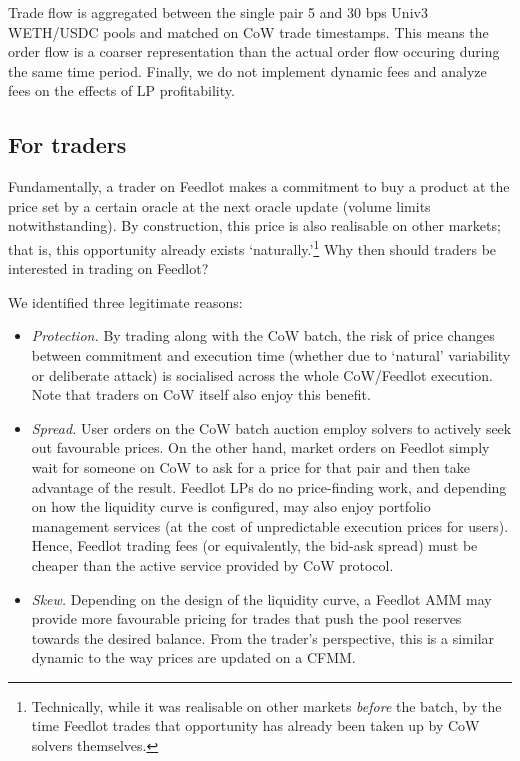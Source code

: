 \documentclass[a4paper,10pt]{article}
\theoremstyle{remark}
\begin{document}
Trade flow is aggregated between the single pair 5 and 30 bps Univ3 WETH/USDC pools and matched on CoW trade timestamps. This means the order flow is a coarser representation than the actual order flow occuring during the same time period. 
%
Finally, we do not implement dynamic fees and analyze fees on the effects of LP profitability. 

\subsection{For traders}

Fundamentally, a trader on Feedlot makes a commitment to buy a product at the price set by a certain oracle at the next oracle update (volume limits notwithstanding).
%
By construction, this price is also realisable on other markets; that is, this opportunity already exists `naturally.'\footnote{Technically, while it was realisable on other markets \emph{before} the batch, by the time Feedlot trades that opportunity has already been taken up by CoW solvers themselves.}
%
Why then should traders be interested in trading on Feedlot?

We identified three legitimate reasons:
\begin{itemize}
  \item 
    \emph{Protection.} By trading along with the CoW batch, the risk of price changes between commitment and execution time (whether due to `natural' variability or deliberate attack) is socialised across the whole CoW/Feedlot execution.
    Note that traders on CoW itself also enjoy this benefit.
    
  \item
    \emph{Spread.} User orders on the CoW batch auction employ solvers to actively seek out favourable prices. On the other hand, market orders on Feedlot simply wait for someone on CoW to ask for a price for that pair and then take advantage of the result.
    Feedlot LPs do no price-finding work, and depending on how the liquidity curve is configured, may also enjoy portfolio management services (at the cost of unpredictable execution prices for users).
    Hence, Feedlot trading fees (or equivalently, the bid-ask spread) must be cheaper than the active service provided by CoW protocol.
    
  \item
    \emph{Skew.} Depending on the design of the liquidity curve, a Feedlot AMM may provide more favourable pricing for trades that push the pool reserves towards the desired balance.
    From the trader's perspective, this is a similar dynamic to the way prices are updated on a CFMM.

\end{itemize}
\end{document}
